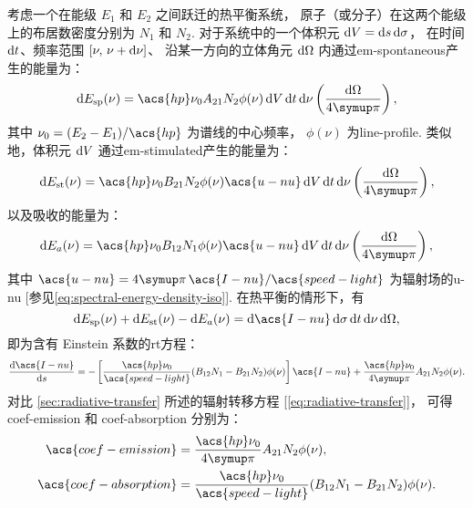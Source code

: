 考虑一个在能级 $E_1$ 和 $E_2$ 之间跃迁的热平衡系统，
原子（或分子）在这两个能级上的布居数密度分别为 $N_1$ 和 $N_2$.
对于系统中的一个体积元 $\mathrm{d}V = \mathrm{d}s\,\mathrm{d}\sigma$，
在时间 $\mathrm{d}t$、频率范围 $[\nu, \,\nu+\mathrm{d}\nu]$、
沿某一方向的立体角元 $\mathrm{d}\Omega$ 内通过\ac{em-spontaneous}产生的能量为：
\begin{equation}
  \D{E_{\R{sp}}(\nu)} = \acs{hp} \nu_0 A_{21} N_2 \phi(\nu)
    \,\D{V}\,\D{t}\,\D{\nu} \left( \frac{\D{\Omega}}{4\Cpi} \right) ,
\end{equation}
其中 $\nu_0 = (E_2 - E_1) / \acs{hp}$ 为谱线的中心频率，
$\phi(\nu)$ 为\acf{line-profile}.
类似地，体积元 $\mathrm{d}V$ 通过\ac{em-stimulated}产生的能量为：
\begin{equation}
  \D{E_{\R{st}}(\nu)} = \acs{hp} \nu_0 B_{21} N_2 \phi(\nu) \acs{u-nu}
    \,\D{V}\,\D{t}\,\D{\nu} \left( \frac{\D{\Omega}}{4\Cpi} \right) ,
\end{equation}
以及吸收的能量为：
\begin{equation}
  \D{E_a(\nu)} = \acs{hp} \nu_0 B_{12} N_1 \phi(\nu) \acs{u-nu}
    \,\D{V}\,\D{t}\,\D{\nu} \left( \frac{\D{\Omega}}{4\Cpi} \right) ,
\end{equation}
其中
$\acs{u-nu} = 4\Cpi\,\acs{I-nu} / \acs{speed-light}$
为辐射场的\acl{u-nu} [参见\autoref{eq:spectral-energy-density-iso}].
在热平衡的情形下，有
\begin{equation}
  \D{E_{\R{sp}}(\nu)} + \D{E_{\R{st}}(\nu)} - \D{E_a(\nu)}
    = \D{\acs{I-nu}}\,\D{\sigma}\,\D{t}\,\D{\nu}\,\D{\Omega} ,
\end{equation}
即为含有 Einstein 系数的\ac{rt}方程：
\begin{equation}
  \diff{\acs{I-nu}}{s}
    = - \left [ \frac{\acs{hp} \nu_0}{\acs{speed-light}}
      (B_{12} N_1 - B_{21} N_2) \phi(\nu) \right] \acs{I-nu}
      + \frac{\acs{hp} \nu_0}{4\Cpi} A_{21} N_2 \phi(\nu) .
\end{equation}
对比 \autoref{sec:radiative-transfer} 所述的辐射转移方程
[\autoref{eq:radiative-transfer}]，
可得 \acs{coef-emission} 和 \acs{coef-absorption} 分别为：
\begin{align}
  \acs{coef-emission}
    & = \frac{\acs{hp} \nu_0}{4\Cpi} A_{21} N_2 \phi(\nu) ,
  \label{eq:coef-emission-einstein} \\
  \acs{coef-absorption}
    & = \frac{\acs{hp} \nu_0}{\acs{speed-light}}
      (B_{12} N_1 - B_{21} N_2) \phi(\nu) .
  \label{eq:coef-absorption-einstein1}
\end{align}

